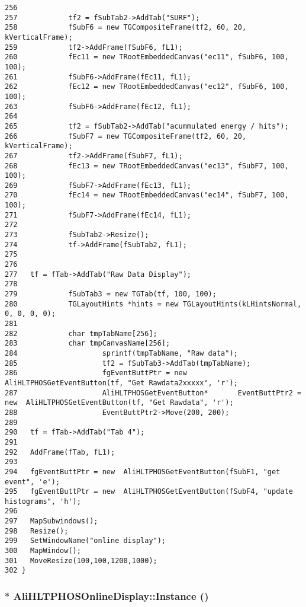 \begin{verbatim}
256 
257            tf2 = fSubTab2->AddTab("SURF"); 
258            fSubF6 = new TGCompositeFrame(tf2, 60, 20, kVerticalFrame);
259            tf2->AddFrame(fSubF6, fL1);
260            fEc11 = new TRootEmbeddedCanvas("ec11", fSubF6, 100, 100);
261            fSubF6->AddFrame(fEc11, fL1);
262            fEc12 = new TRootEmbeddedCanvas("ec12", fSubF6, 100, 100);
263            fSubF6->AddFrame(fEc12, fL1);
264 
265            tf2 = fSubTab2->AddTab("acummulated energy / hits"); 
266            fSubF7 = new TGCompositeFrame(tf2, 60, 20, kVerticalFrame);
267            tf2->AddFrame(fSubF7, fL1);
268            fEc13 = new TRootEmbeddedCanvas("ec13", fSubF7, 100, 100);
269            fSubF7->AddFrame(fEc13, fL1);
270            fEc14 = new TRootEmbeddedCanvas("ec14", fSubF7, 100, 100);
271            fSubF7->AddFrame(fEc14, fL1);
272 
273            fSubTab2->Resize();
274            tf->AddFrame(fSubTab2, fL1);
275 
276 
277   tf = fTab->AddTab("Raw Data Display");
278 
279            fSubTab3 = new TGTab(tf, 100, 100);
280            TGLayoutHints *hints = new TGLayoutHints(kLHintsNormal, 0, 0, 0, 0); 
281 
282            char tmpTabName[256];
283            char tmpCanvasName[256];
284                    sprintf(tmpTabName, "Raw data");
285                    tf2 = fSubTab3->AddTab(tmpTabName);
286                    fgEventButtPtr = new  AliHLTPHOSGetEventButton(tf, "Get Rawdata2xxxxx", 'r');
287                    AliHLTPHOSGetEventButton*       EventButtPtr2 = new  AliHLTPHOSGetEventButton(tf, "Get Rawdata", 'r'); 
288                    EventButtPtr2->Move(200, 200); 
289 
290   tf = fTab->AddTab("Tab 4");
291 
292   AddFrame(fTab, fL1);
293 
294   fgEventButtPtr = new  AliHLTPHOSGetEventButton(fSubF1, "get event", 'e');
295   fgEventButtPtr = new  AliHLTPHOSGetEventButton(fSubF4, "update histograms", 'h');
296 
297   MapSubwindows();
298   Resize();
299   SetWindowName("online display");
300   MapWindow();
301   MoveResize(100,100,1200,1000);
302 }
\end{verbatim}\normalsize 


\subsubsection{ $\ast$ Ali\-HLTPHOSOnline\-Display::Instance ()\hspace{0.3cm}{\tt  [static]}}\label{classAliHLTPHOSOnlineDisplay_e1}




